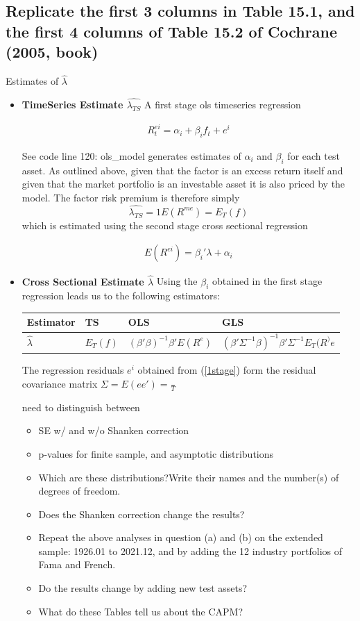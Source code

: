 \documentclass[]{article}
\begin{document}
\subsection*{Replicate the first 3 columns in Table 15.1, and the first 4 columns of Table  15.2 of  Cochrane  (2005,  book)}

Estimates of $\hat{\lambda}$
\begin{itemize}
	
	\item \textbf{TimeSeries Estimate $\hat{\lambda_{TS}}$} A first stage ols timeseries regression 
	
	\begin{align}\label{1stage}
		R_t^{ei}=\alpha_i+\beta_i f_t+e^i
	\end{align}
	
	See code line 120: ols\_model generates estimates of $\alpha_i$ and $\beta_i$ for each test asset. As outlined above, given that the factor is an excess return itself and given that the market portfolio is an investable asset it is also priced by the model. The factor risk premium is therefore simply $$\hat{\lambda_{TS}}=1 E(R^{me}) = E_T(f)$$ which is estimated using the second stage cross sectional regression 
	
	\begin{align}
		E(R^{ei})=\beta_i'\lambda + \alpha_i
	\end{align}
	
	\item \textbf{Cross Sectional Estimate $\hat{\lambda}$} Using the $\beta_i$ obtained in the first stage regression leads us to the following estimators:
	
	\begin{tabular}{|l|l|l|l|}
		\hline
		Estimator & TS & OLS & GLS \\
		\hline
		$\hat{\lambda}$&$E_T(f)$&$(\beta'\beta)^{-1}\beta'E(R^e)$&$\left(\beta'\Sigma^{-1}\beta\right)^{-1}\beta'\Sigma^{-1}E_T(R^)e$\\
		\hline
	\end{tabular}
	
	The regression residuals $e^i$ obtained from (\ref{1stage}) form the  residual covariance matrix $\Sigma = E(ee') = \frac{}{T}$
	
	need to distinguish between
	\begin{itemize}
		\item SE w/ and w/o Shanken correction\\
		\item p-values for finite sample, and asymptotic distributions\\
		\item Which  are  these  distributions?Write  their names and the number(s) of degrees of freedom.
		\item Does  the  Shanken  correction  change  the  results?
		\item Repeat the above analyses in question (a) and (b) on the extended sample: 1926.01 to 2021.12, and by adding the 12 industry portfolios of Fama and French.
		\item Do the results change by adding new test assets?
		\item What do these Tables tell us about the CAPM?
		

\end{itemize}
\end{itemize}
\end{document}

